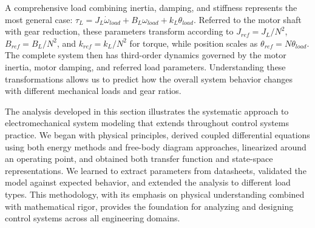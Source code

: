 A comprehensive load combining inertia, damping, and stiffness represents the most general case: $\tau_L = J_L \dot{\omega}_{load} + B_L \omega_{load} + k_L \theta_{load}$. Referred to the motor shaft with gear reduction, these parameters transform according to $J_{ref} = J_L / N^2$, $B_{ref} = B_L / N^2$, and $k_{ref} = k_L / N^2$ for torque, while position scales as $\theta_{ref} = N \theta_{load}$. The complete system then has third-order dynamics governed by the motor inertia, motor damping, and referred load parameters. Understanding these transformations allows us to predict how the overall system behavior changes with different mechanical loads and gear ratios.

The analysis developed in this section illustrates the systematic approach to electromechanical system modeling that extends throughout control systems practice. We began with physical principles, derived coupled differential equations using both energy methods and free-body diagram approaches, linearized around an operating point, and obtained both transfer function and state-space representations. We learned to extract parameters from datasheets, validated the model against expected behavior, and extended the analysis to different load types. This methodology, with its emphasis on physical understanding combined with mathematical rigor, provides the foundation for analyzing and designing control systems across all engineering domains.
